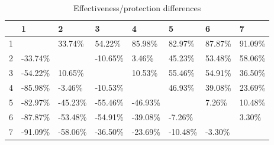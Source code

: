 \begin{table}[ht]
\centering
\begin{tabular}{rlllllll}
  \hline
 & 1 & 2 & 3 & 4 & 5 & 6 & 7 \\ 
  \hline
1 &  & 33.74\% & 54.22\% & 85.98\% & 82.97\% & 87.87\% & 91.09\% \\ 
  2 & -33.74\% &  & -10.65\% & 3.46\% & 45.23\% & 53.48\% & 58.06\% \\ 
  3 & -54.22\% & 10.65\% &  & 10.53\% & 55.46\% & 54.91\% & 36.50\% \\ 
  4 & -85.98\% & -3.46\% & -10.53\% &  & 46.93\% & 39.08\% & 23.69\% \\ 
  5 & -82.97\% & -45.23\% & -55.46\% & -46.93\% &  & 7.26\% & 10.48\% \\ 
  6 & -87.87\% & -53.48\% & -54.91\% & -39.08\% & -7.26\% &  & 3.30\% \\ 
  7 & -91.09\% & -58.06\% & -36.50\% & -23.69\% & -10.48\% & -3.30\% &  \\ 
   \hline
\end{tabular}
\caption{Effectiveness/protection differences} 
\end{table}
